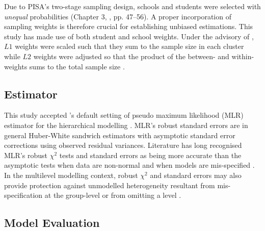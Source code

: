 Due to PISA's two-stage sampling design, schools and students were selected with \emph{unequal} probabilities (Chapter 3, \citet{PISAspss}, pp. 47--56). A proper incorporation of sampling weights is therefore crucial for establishing unbiased estimations. This study has made use of both student and school weights. Under the advisory of \citet{asparouhov:2006}, $L1$ weights were scaled such that they sum to the sample size in each cluster while $L2$ weights were adjusted so that the product of the between- and within-weights sums to the total sample size \citep[][pp. 622--624]{mplus:manual}.

\subsection{Estimator}\label{sec:mlr}

This study accepted \CM's default setting of pseudo maximum likelihood (MLR) estimator for the hierarchical modelling \citep[Chapter 16,][pp. 666 \& 668]{mplus:manual}. MLR's robust standard errors are in general Huber-White sandwich estimators \citep{huber:1967, white:1982} with asymptotic standard error corrections using observed residual variances. Literature has long recognised MLR's robust $\chi^2$ tests and standard errors as being more accurate than the asymptotic tests when data are non-normal and when models are mis-specified \citep{chou:1991, curran:1996}. In the multilevel modelling context, robust $\chi^2$ and standard errors may also provide protection against unmodelled heterogeneity resultant from mis-specification at the group-level or from omitting a level \citep{hox:2010}.

\subsection{Model Evaluation}

